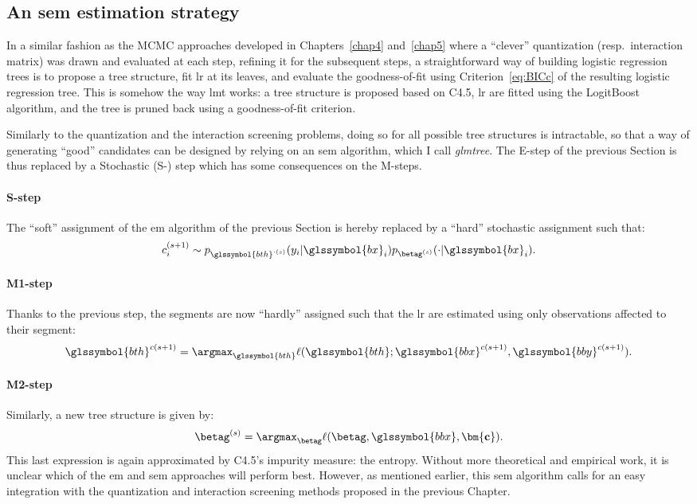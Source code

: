 \subsection{An \gls{sem} estimation strategy} \label{subsec:sem}

In a similar fashion as the MCMC approaches developed in Chapters~\ref{chap4} and~\ref{chap5} where a ``clever'' quantization (resp.\ interaction matrix) was drawn and evaluated at each step, refining it for the subsequent steps, a straightforward way of building logistic regression trees is to propose a tree structure, fit \gls{lr} at its leaves, and evaluate the goodness-of-fit using Criterion~\ref{eq:BICc} of the resulting logistic regression tree. This is somehow the way \gls{lmt} works: a tree structure is proposed based on C4.5, \gls{lr} are fitted using the LogitBoost algorithm, and the tree is pruned back using a goodness-of-fit criterion.

Similarly to the quantization and the interaction screening problems, doing so for all possible tree structures is intractable, so that a way of generating ``good'' candidates can be designed by relying on an \gls{sem} algorithm, which I call \textit{glmtree}. The E-step of the previous Section is thus replaced by a Stochastic (S-) step which has some consequences on the M-steps.
\paragraph{S-step} The ``soft'' assignment of the \gls{em} algorithm of the previous Section is hereby replaced by a ``hard'' stochastic assignment such that:
\[ c_i^{(s+1)} \sim p_{\glssymbol{bth}^{\cdot(s)}}(y_i | \glssymbol{bx}_i) p_{\betag^{(s)}}(\cdot | \glssymbol{bx}_i). \]
\paragraph{M1-step} Thanks to the previous step, the segments are now ``hardly'' assigned such that the \gls{lr} are estimated using only observations affected to their segment:
\[ \glssymbol{bth}^{c(s+1)} = \argmax_{\glssymbol{bth}} \ell(\glssymbol{bth};\glssymbol{bbx}^{c(s+1)},\glssymbol{bby}^{c(s+1)}). \]
\paragraph{M2-step} Similarly, a new tree structure is given by:
\[ \betag^{(s)} = \argmax_{\betag} \ell(\betag, \glssymbol{bbx}, \mathbf{\bm{c}}). \]
This last expression is again approximated by C4.5's impurity measure: the entropy. Without more theoretical and empirical work, it is unclear which of the \gls{em} and \gls{sem} approaches will perform best. However, as mentioned earlier, this \gls{sem} algorithm calls for an easy integration with the quantization and interaction screening methods proposed in the previous Chapter.

